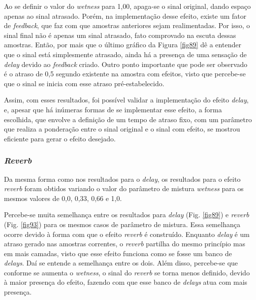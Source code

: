 
Ao se definir o valor do \textit{wetness} para 1,00, apaga-se o sinal original, dando espaço apenas ao sinal atrasado. Porém, na implementação desse efeito, existe um fator de \textit{feedback}, que faz com que amostras anteriores sejam realimentadas. Por isso, o sinal final não é apenas um sinal atrasado, fato comprovado na escuta dessas amostras. Então, por mais que o último gráfico da Figura \ref{fig89} dê a entender que o sinal está simplesmente atrasado, ainda há a presença de uma sensação de \textit{delay} devido ao \textit{feedback} criado. Outro ponto importante que pode ser observado é o atraso de 0,5 segundo existente na amostra com efeitos, visto que percebe-se que o sinal se inicia com esse atraso pré-estabelecido.


Assim, com esses resultados, foi possível validar a implementação do efeito \textit{delay}, e, apesar que há inúmeras formas de se implementar esse efeito, a forma escolhida, que envolve a definição de um tempo de atraso fixo, com um parâmetro que realiza a ponderação entre o sinal original e o sinal com efeito, se mostrou eficiente para gerar o efeito desejado.

\subsubsection*{\textit{Reverb}}

Da mesma forma como nos resultados para o \textit{delay}, os resultados para o efeito \textit{reverb} foram obtidos variando o valor do parâmetro de mistura \textit{wetness} para os mesmos valores de 0,0, 0,33, 0,66 e 1,0.

Percebe-se muita semelhança entre os resultados para \textit{delay} (Fig. \ref{fig89}) e \textit{reverb} (Fig. \ref{fig93}) para os mesmos casos de parâmetro de mistura. Essa semelhança ocorre devido à forma com que o efeito \textit{reverb} é construído. Enquanto \textit{delay} é um atraso gerado nas amostras correntes, o \textit{reverb} partilha do mesmo princípio mas em mais camadas, visto que esse efeito funciona como se fosse um banco de \textit{delays}. Daí se entende a semelhança entre os dois. Além disso, percebe-se que conforme se aumenta o \textit{wetness}, o sinal do \textit{reverb} se torna menos definido, devido à maior presença do efeito, fazendo com que esse banco de \textit{delays} atua com mais presença.

